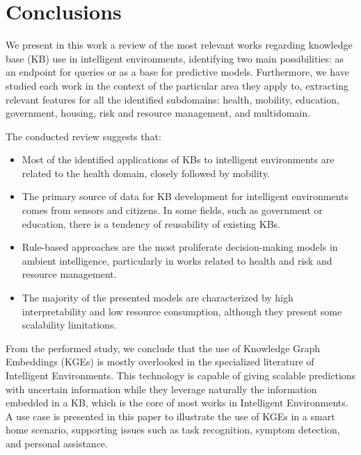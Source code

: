 \section{Conclusions} \label{conclusion}
We present in this work a review of the most relevant works regarding knowledge base (KB) use in intelligent environments, identifying two main possibilities: as an endpoint for queries or as a base for predictive models. Furthermore, we have studied each work in the context of the particular area they apply to, extracting relevant features for all the identified subdomains: health, mobility, education, government, housing, risk and resource management, and multidomain. 



The conducted review suggests that:
\begin{itemize}
    \item Most of the identified applications of KBs to intelligent environments are related to the health domain, closely followed by mobility.
    \item The primary source of data for KB development for intelligent environments comes from sensors and citizens. In some fields, such as government or education, there is a tendency of reusability of existing KBs.
    \item Rule-based approaches are the most proliferate decision-making models in ambient intelligence, particularly in works related to health and risk and resource management.
    \item The majority of the presented models are characterized by high interpretability and low resource consumption, although they present some scalability limitations.
\end{itemize}

From the performed study, we conclude that the use of Knowledge Graph Embeddings (KGEs) is mostly overlooked in the specialized literature of Intelligent Environments. This technology is capable of giving scalable predictions with uncertain information while they leverage naturally the information embedded in a KB, which is the core of most works in Intelligent Environments. A use case is presented in this paper to illustrate the use of KGEs in a smart home scenario, supporting issues such as task recognition, symptom detection, and personal assistance. 
